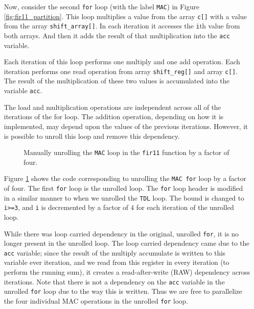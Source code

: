 Now, consider the second \lstinline{for} loop (with the label \lstinline{MAC}) in Figure \ref{fig:fir11_partition}. This loop multiplies a value from the array \lstinline{c[]} with a value from the array \lstinline{shift_array[]}. In each iteration it accesses the \lstinline{i}th value from both arrays. And then it adds the result of that multiplication into the \lstinline{acc} variable. 

Each iteration of this loop performs one multiply and one add operation. Each iteration performs one read operation from array \lstinline{shift_reg[]} and array \lstinline{c[]}. The result of the multiplication of these two values is accumulated into the variable \lstinline{acc}. 

The load and multiplication operations are independent across all of the iterations of the for loop. The addition operation, depending on how it is implemented, may depend upon the values of the previous iterations. However, it is possible to unroll this loop and remove this dependency.

\begin{figure}

\caption{ Manually unrolling the \lstinline{MAC} loop in the \lstinline{fir11} function by a factor of four.  }
\label{fig:fir11_unrollMAC}
\end{figure}

Figure \ref{fig:fir11_unrollMAC} shows the code corresponding to unrolling the \lstinline{MAC for} loop by a factor of four.  The first \lstinline{for} loop is the unrolled loop. The \lstinline{for} loop header is modified in a similar manner to when we unrolled the  \lstinline{TDL} loop. The bound is changed to \lstinline{i>=3}, and \lstinline{i} is decremented by a factor of $4$ for each iteration of the unrolled loop.

While there was loop carried dependency in the original, unrolled \lstinline{for}, it is no longer present in the unrolled loop. The loop carried dependency came due to the \lstinline{acc} variable; since the result of the multiply accumulate is written to this variable ever iteration, and we read from this register in every iteration (to perform the running sum), it creates a read-after-write (RAW) dependency across iterations.  Note that there is not a dependency on the \lstinline{acc} variable in the unrolled \lstinline{for} loop due to the way this is written. Thus we are free to parallelize the four individual MAC operations in the unrolled \lstinline{for} loop. 

